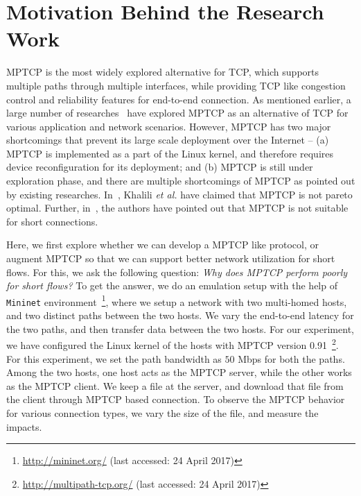 \section{Motivation Behind the Research Work}

MPTCP is the most widely explored alternative for TCP, which supports multiple paths through multiple interfaces, while providing TCP like congestion control and reliability features for end-to-end connection. As mentioned earlier, a large number of researches~\cite{oh2016feedback,barik2016lisa,OLIARamin2012,kheirkhah2016mmptcp,kheirkhah2015short} have explored MPTCP as an alternative of TCP for various application and network scenarios. However, MPTCP has two major shortcomings that prevent its large scale deployment over the Internet -- (a) MPTCP is implemented as a part of the Linux kernel, and therefore requires device reconfiguration for its deployment; and (b) MPTCP is still under exploration phase, and there are multiple shortcomings of MPTCP as pointed out by existing researches. In~\cite{OLIARamin2012}, Khalili \textit{et al.} have claimed that MPTCP is not pareto optimal. Further, in~\cite{kheirkhah2016mmptcp}, the authors have pointed out that MPTCP is not suitable for short connections. 

Here, we first explore whether we can develop a MPTCP like protocol, or augment MPTCP so that we can support better network utilization for short flows. For this, we ask the following question: \textit{Why does MPTCP perform poorly for short flows?}  To get the answer, we do an emulation setup with the help of \texttt{Mininet} environment~\footnote{\url{http://mininet.org/} (last accessed: 24 April 2017)}, where we setup a network with two multi-homed hosts, and two distinct paths between the two hosts. We vary the end-to-end latency for the two paths, and then transfer data between the two hosts. For our experiment, we have configured the Linux kernel of the hosts with MPTCP version 0.91~\footnote{\url{http://multipath-tcp.org/} (last accessed: 24 April 2017)}. For this experiment, we set the path bandwidth as $50$ Mbps for both the paths. Among the two hosts, one host acts as the MPTCP server, while the other works as the MPTCP client. We keep a file at the server, and download that file from the client through MPTCP based connection. To observe the MPTCP behavior for various connection types, we vary the size of the file, and measure the impacts. 
%
%		

